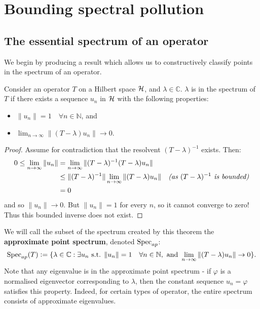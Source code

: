 \documentclass[../main.tex]{subfiles}
\begin{document}
\section{Bounding spectral pollution}\label{chapter:bounds}

\subsection{The essential spectrum of an operator}\label{sec:ess-spec}

We begin by producing a result which allows us to constructively classify points
in the spectrum of an operator.
\begin{theorem}
\label{thm:approx-eigenvalue-thm}
  Consider an operator $T$ on a Hilbert space $\mathcal{H}$, and $\lambda \in
  \mathbb{C}$. $\lambda$ is in the spectrum of $T$ if there exists a
  sequence $u_n$ in $\mathcal{H}$ with the following properties:
  \begin{itemize}
  \item $\|u_n\| = 1\quad \forall n \in \mathbb{N}$, and
  \item $\lim_{n \rightarrow \infty}\|(T - \lambda)u_n\|  \rightarrow 0$.
  \end{itemize}
\end{theorem}
\begin{proof}
Assume for contradiction that the resolvent $(T - \lambda)^{-1}$ exists. Then:
\begin{align*}
0 \leq \lim_{n \rightarrow \infty} \|u_n\| & 
	= \lim_{n \rightarrow \infty} \|(T - \lambda)^{-1}(T - \lambda)u_n\| & \\
& \leq \|(T - \lambda)^{-1}\| \lim_{n \rightarrow \infty} \|(T - \lambda)u_n\| & 
	\text{\emph{(as $(T - \lambda)^{-1}$ is bounded)}}\\
& = 0
\end{align*}
and so $\|u_n\| \rightarrow 0$. But $\|u_n\| = 1$ for every $n$, so it cannot
converge to zero! Thus this bounded inverse does not exist.
\end{proof}
We will call the subset of the spectrum created by this theorem the
\textbf{approximate point spectrum}, denoted
$\mathrm{Spec}_{ap}$:
$$\mathrm{Spec}_{ap}(T) \mathrel{\mathop:}= \{ \lambda \in \mathbb{C} : \exists u_n \text{ s.t. } \|u_n\| = 1\quad \forall n \in \mathbb{N},\text{ and }\lim_{n \rightarrow \infty}\|(T - \lambda)u_n\|  \rightarrow 0\}.$$
Note that any eigenvalue is in the approximate point spectrum - if $\varphi$ is
a normalised eigenvector corresponding to $\lambda$, then the constant sequence
$u_n = \varphi$ satisfies this property. Indeed, for certain types of operator,
the entire spectrum consists of approximate eigenvalues.
\end{document}
